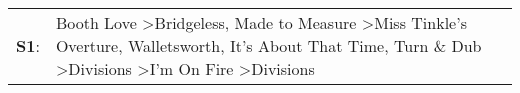 \begin{supertabular}{p{0.03\textwidth}p{0.92\textwidth}}
 \textbf{S1}:  &  Booth Love\textsuperscript{} \textgreater \enspace Bridgeless\textsuperscript{}, \enspace Made to Measure\textsuperscript{} \textgreater \enspace Miss Tinkle's Overture\textsuperscript{}, \enspace Walletsworth\textsuperscript{}, \enspace It's About That Time\textsuperscript{}, \enspace Turn \& Dub\textsuperscript{} \textgreater \enspace Divisions\textsuperscript{} \textgreater \enspace I'm On Fire\textsuperscript{} \textgreater \enspace Divisions\textsuperscript{}  \enspace  \\
\end{supertabular}
